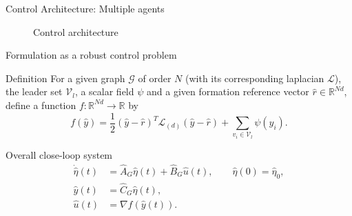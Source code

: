 \documentclass{beamer}
\begin{document}
\begin{frame}{Control Architecture: Multiple agents}
\begin{figure}[ht]
	
	\caption{Control architecture}
\end{figure}
\end{frame}
\begin{frame}{Formulation as a robust control problem}
	\begin{block}{Definition}	
		For a given graph $\mathcal{G}$ of order $N$ (with its corresponding laplacian $\mathcal{L}$), the leader set $\mathcal{V}_l$, a scalar field $\psi$ and a given formation reference vector $\hat{r} \in \mathbb{R}^{Nd}$, define a function $f:\mathbb{R}^{Nd}\rightarrow \mathbb{R}$ by
		\begin{equation}\label{eq:defn_f}
			f(\hat{y})=\frac{1}{2}(\hat{y}-\hat{r})^T\mathcal{L}_{(d)}(\hat{y}-\hat{r}) + \sum_{v_i \in \mathcal{V}_l} \psi(y_i).
		\end{equation}	
	\end{block}
	\pause
	\begin{block}{Overall close-loop system}
	\begin{equation} \label{eq:sys_dyn_G_hat}
		\begin{split}
			\Dot{\hat{\eta}}(t)&=\hat{A}_G\hat{\eta}(t) + \hat{B}_G \hat{u}(t), \quad \quad \hat{\eta}(0)=\hat{\eta}_{0},\\
			\hat{y}(t)&=\hat{C}_G \hat{\eta}(t), \\
			\hat{u}(t)&=\nabla f (\hat{y}(t)).
		\end{split}
	\end{equation}
	\end{block}
\end{frame}
\end{document}

